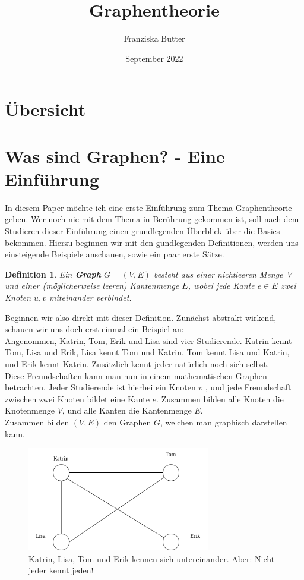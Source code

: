 \documentclass{article}
\title{Graphentheorie}
\author{Franziska Butter}
\date{September 2022}
\newtheorem{definition}{Definition}
\theoremstyle{plain}
\begin{document}
\maketitle

\section{Übersicht}
	\tableofcontents

\newpage

\section{Was sind Graphen? - Eine Einführung}
In diesem Paper möchte ich eine erste Einführung zum Thema Graphentheorie geben. Wer noch nie mit dem Thema in Berührung gekommen ist, soll nach dem Studieren dieser Einführung einen grundlegenden Überblick über die Basics bekommen. Hierzu beginnen wir mit den gundlegenden Definitionen, werden uns einsteigende Beispiele anschauen, sowie ein paar erste Sätze.\\
\bigskip
\begin{definition} 
            Ein \textbf{Graph} \( G = (V, E)\) besteht aus einer nichtleeren Menge V und einer (möglicherweise leeren) Kantenmenge \(E\), wobei jede Kante \(e \in E\) zwei Knoten \(u, v\) miteinander verbindet.
\end{definition}
\bigskip
Beginnen wir also direkt mit dieser Definition. Zunächst abstrakt wirkend, schauen wir uns doch erst einmal ein Beispiel an:\\
Angenommen, Katrin, Tom, Erik und Lisa sind vier Studierende. Katrin kennt Tom, Lisa und Erik, Lisa kennt Tom und Katrin, Tom kennt Lisa und Katrin, und Erik kennt Katrin. Zusätzlich kennt jeder natürlich noch sich selbst.\\
Diese Freundschaften kann man nun in einem mathematischen Graphen betrachten. Jeder Studierende ist hierbei ein Knoten \(v\) , und jede Freundschaft zwischen zwei Knoten bildet eine Kante \(e\). Zusammen bilden alle Knoten die Knotenmenge \(V\), und alle Kanten die Kantenmenge \(E\).\\
Zusammen bilden \((V, E)\) den Graphen \(G\), welchen man graphisch darstellen kann.\\
\bigskip
\begin{figure}[!htp]
    \centering
    \includegraphics[width=8cm]{vortrag_schriftlich/images/graph_one.drawio.png}
    \caption{Katrin, Lisa, Tom und Erik kennen sich untereinander. Aber: Nicht jeder kennt jeden!}
    \label{fig:fig1}
\end{figure}
\end{document}
